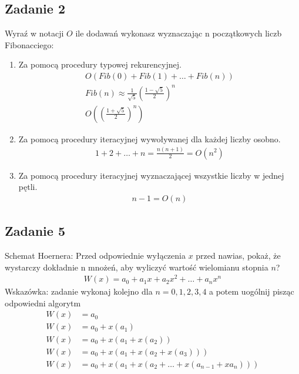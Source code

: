 \documentclass{article}
\begin{document}
\subsection*{Zadanie 2}
Wyraź w notacji $O$ ile dodawań wykonasz wyznaczając n początkowych liczb Fibonacciego:
\begin{enumerate}[label=(\alph*)]
    \item Za pomocą procedury typowej rekurencyjnej.
          \begin{gather*}
              O(Fib(0) + Fib(1) + \dots + Fib(n)) \\
              Fib(n) \approx \frac{1}{\sqrt{5}}\left(\frac{1-\sqrt{5}}{2}\right)^n \\
              O\left(\left(\frac{1+\sqrt{5}}{2}\right)^n\right)
          \end{gather*}
    \item Za pomocą procedury iteracyjnej wywoływanej dla każdej liczby osobno.
          \begin{gather*}
              1 + 2 + \dots + n = \frac{n(n+1)}{2} = O(n^2)
          \end{gather*}
    \item Za pomocą procedury iteracyjnej wyznaczającej wszystkie liczby w jednej pętli.
          \begin{gather*}
              n - 1 = O(n)
          \end{gather*}
\end{enumerate}

\subsection*{Zadanie 5}
Schemat Hoernera: Przed odpowiednie wyłączenia $x$ przed nawias, pokaż, że wystarczy
dokładnie n mnożeń, aby wyliczyć wartość wielomianu stopnia $n$?
\begin{gather*}
    W(x) = a_0 + a_1x + a_2x^2 + \dots + a_nx^n
\end{gather*}
Wskazówka: zadanie wykonaj kolejno dla $n = 0, 1, 2, 3, 4$ a potem uogólnij pisząc odpowiedni algorytm
\begin{align*}
    W(x) & = a_0                                                    \\
    W(x) & = a_0 + x(a_1)                                           \\
    W(x) & = a_0 + x(a_1 + x(a_2))                                  \\
    W(x) & = a_0 + x(a_1 + x(a_2 + x(a_3)))                         \\
    W(x) & = a_0 + x(a_1 + x(a_2 + \dots + x(a_{n-1} + xa_n)))
\end{align*}
\end{document}
